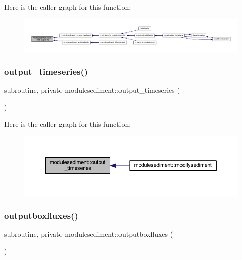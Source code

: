 Here is the caller graph for this function\+:\nopagebreak
\begin{figure}[H]
\begin{center}
\leavevmode
\includegraphics[width=350pt]{namespacemodulesediment_afe850b14e10e8db70a1bd5879fc5c2ea_icgraph}
\end{center}
\end{figure}
\mbox{\label{namespacemodulesediment_a5763876f73ef752f30208f2fd9aba61e}} 
\subsubsection{\texorpdfstring{output\+\_\+timeseries()}{output\_timeseries()}}
{\footnotesize\ttfamily subroutine, private modulesediment\+::output\+\_\+timeseries (\begin{DoxyParamCaption}{ }\end{DoxyParamCaption})\hspace{0.3cm}{\ttfamily [private]}}

Here is the caller graph for this function\+:\nopagebreak
\begin{figure}[H]
\begin{center}
\leavevmode
\includegraphics[width=350pt]{namespacemodulesediment_a5763876f73ef752f30208f2fd9aba61e_icgraph}
\end{center}
\end{figure}
\mbox{\label{namespacemodulesediment_abf7a07c3cdbe931d82c21146e433eaeb}} 
\subsubsection{\texorpdfstring{outputboxfluxes()}{outputboxfluxes()}}
{\footnotesize\ttfamily subroutine, private modulesediment\+::outputboxfluxes (\begin{DoxyParamCaption}{ }\end{DoxyParamCaption})\hspace{0.3cm}{\ttfamily [private]}}

